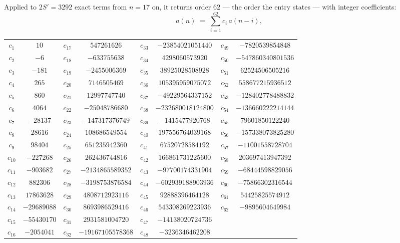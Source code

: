 \documentclass[11pt,a4paper]{article}
\theoremstyle{plain}
\theoremstyle{definition}
\begin{document}
Applied to $2S'=3292$ exact terms from $n=17$ on, it returns order $62$ --- the
order the entry states --- with integer coefficients:
\[
a(n)\;=\;\sum_{i=1}^{62}c_i\,a(n-i),
\]
\begin{center}\small
\begin{tabular}{cccccccc}
$c_{1}$ & $10$ & $c_{17}$ & $547261626$ & $c_{33}$ & $-23854021051440$ & $c_{49}$ & $-7820539854848$ \\
$c_{2}$ & $-6$ & $c_{18}$ & $-633755638$ & $c_{34}$ & $4298060573920$ & $c_{50}$ & $-547860340801536$ \\
$c_{3}$ & $-181$ & $c_{19}$ & $-2455006369$ & $c_{35}$ & $38925028508928$ & $c_{51}$ & $62524506505216$ \\
$c_{4}$ & $265$ & $c_{20}$ & $7146505469$ & $c_{36}$ & $105395959075072$ & $c_{52}$ & $558677215936512$ \\
$c_{5}$ & $860$ & $c_{21}$ & $12997747740$ & $c_{37}$ & $-49229564337152$ & $c_{53}$ & $-128402778488832$ \\
$c_{6}$ & $4064$ & $c_{22}$ & $-25048786680$ & $c_{38}$ & $-232680018124800$ & $c_{54}$ & $-136660222214144$ \\
$c_{7}$ & $-28137$ & $c_{23}$ & $-147317376749$ & $c_{39}$ & $-1415477920768$ & $c_{55}$ & $79601850122240$ \\
$c_{8}$ & $28616$ & $c_{24}$ & $108686549554$ & $c_{40}$ & $197556764039168$ & $c_{56}$ & $-157338073825280$ \\
$c_{9}$ & $98404$ & $c_{25}$ & $651235942360$ & $c_{41}$ & $67520728584192$ & $c_{57}$ & $-11001558728704$ \\
$c_{10}$ & $-227268$ & $c_{26}$ & $262436744816$ & $c_{42}$ & $166861731225600$ & $c_{58}$ & $203697413947392$ \\
$c_{11}$ & $-903682$ & $c_{27}$ & $-2134865589352$ & $c_{43}$ & $-97700174331904$ & $c_{59}$ & $-68444598829056$ \\
$c_{12}$ & $882306$ & $c_{28}$ & $-3198753876584$ & $c_{44}$ & $-602939188903936$ & $c_{60}$ & $-75866302316544$ \\
$c_{13}$ & $17863628$ & $c_{29}$ & $4808712923116$ & $c_{45}$ & $92888396464128$ & $c_{61}$ & $54425825574912$ \\
$c_{14}$ & $-29689088$ & $c_{30}$ & $8693986529416$ & $c_{46}$ & $543308269223936$ & $c_{62}$ & $-9895604649984$ \\
$c_{15}$ & $-55430170$ & $c_{31}$ & $2931581004720$ & $c_{47}$ & $-14138020724736$ &  &  \\
$c_{16}$ & $-2054041$ & $c_{32}$ & $-19167105578368$ & $c_{48}$ & $-3236346462208$ &  &  \\
\end{tabular}
\end{center}
\end{document}
